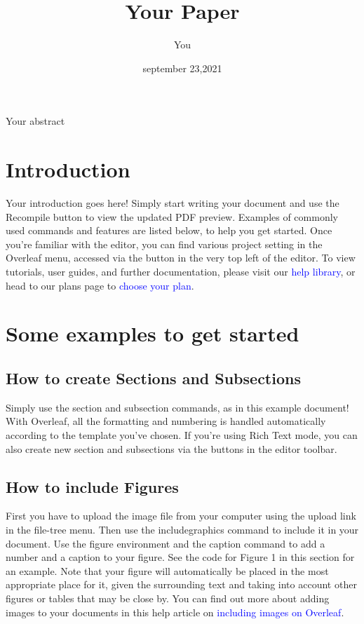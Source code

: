 \documentclass{article}
\title{Your Paper}
\author{You}
\date{september 23,2021}
\begin{document}
	\maketitle
	\begin{abstract}
			\end{abstract}
	Your abstract
	\section{Introduction}
	Your introduction goes here! Simply start writing your document and use the Recompile button to
	view the updated PDF preview. Examples of commonly used commands and features are listed below,
	to help you get started.
	Once you’re familiar with the editor, you can find various project setting in the Overleaf menu,
	accessed via the button in the very top left of the editor. To view tutorials, user guides, and further
	documentation, please visit our \textcolor{blue}{help library}, or head to our plans page to \textcolor{blue}{choose your plan}.
	\section{Some examples to get started }
	\subsection{How to create Sections and Subsections}
	Simply use the section and subsection commands, as in this example document! With Overleaf, all
	the formatting and numbering is handled automatically according to the template you’ve chosen. If
	you’re using Rich Text mode, you can also create new section and subsections via the buttons in the
	editor toolbar.
	\subsection{How to include Figures}
	First you have to upload the image file from your computer using the upload link in the file-tree menu.
	Then use the includegraphics command to include it in your document. Use the figure environment
	and the caption command to add a number and a caption to your figure. See the code for Figure 1 in
	this section for an example.
	Note that your figure will automatically be placed in the most appropriate place for it, given the
	surrounding text and taking into account other figures or tables that may be close by. You can find
	out more about adding images to your documents in this help article on \textcolor{blue}{including images on Overleaf}.
\end{document}
